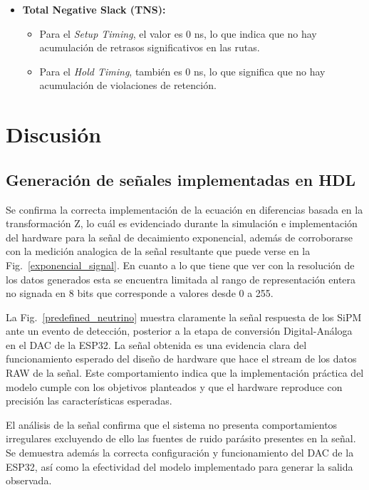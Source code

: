 \documentclass[conference]{IEEEtran}
\begin{document}
{\begin{itemize}
    \item \textbf{Total Negative Slack (TNS):}
    \begin{itemize}
        \item Para el \textit{Setup Timing}, el valor es 0 ns, lo que indica que no hay acumulación de retrasos significativos en las rutas.
        \item Para el \textit{Hold Timing}, también es 0 ns, lo que significa que no hay acumulación de violaciones de retención.
    \end{itemize}
\end{itemize}






\section{Discusión}

\subsection{Generación de señales implementadas en HDL}

Se confirma la correcta implementación de la ecuación en diferencias basada en la transformación Z, lo cuál es evidenciado durante la simulación e implementación del hardware para la señal de decaimiento exponencial, además de corroborarse con la medición analogica de la señal resultante que puede verse en la Fig.~\ref{exponencial_signal}. En cuanto a lo que tiene que ver con la resolución de los datos generados esta se encuentra limitada al rango de representación entera no signada en 8 bits que corresponde a valores desde 0 a 255. 

La Fig.~\ref{predefined_neutrino} muestra claramente la señal respuesta de los SiPM ante un evento de detección, posterior a la etapa de conversión Digital-Análoga en el DAC de la ESP32. La señal obtenida es una evidencia clara del funcionamiento esperado del diseño de hardware que hace el stream de los datos RAW de la señal. Este comportamiento indica que la implementación práctica del modelo cumple con los objetivos planteados y que el hardware reproduce con precisión las características esperadas.

El análisis de la señal confirma que el sistema no presenta comportamientos irregulares excluyendo de ello las fuentes de ruido parásito presentes en la señal. Se demuestra además la correcta configuración y funcionamiento del DAC de la ESP32, así como la efectividad del modelo implementado para generar la salida observada.

}
\end{document}
